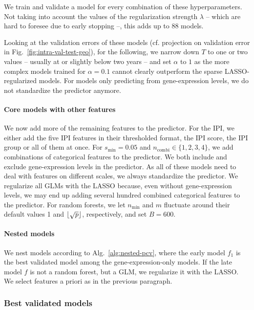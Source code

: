 We train and validate a model for every combination of these hyperparameters.
Not taking into account the values of the regularization strength $\lambda$ -- which are hard to 
foresee due to early stopping --, this adds up to \num{88} models.

Looking at the validation errors of these models (cf. projection on validation error in Fig.\ 
\ref{fig:intra-val-test-geo}), for the following, we narrow down $T$ to one or 
two values -- usually at or slightly below two years -- and set $\alpha$ to $1$ as the more complex 
models trained for $\alpha = \num{0.1}$ cannot clearly outperform the sparse LASSO-regularized 
models. For models only predicting from gene-expression levels, we do not standardize the predictor 
anymore.

\paragraph{Core models with other features}
We now add more of the remaining features to the predictor. For the 
IPI, we either add the five IPI features in their thresholded format, the IPI score, the IPI group
or all of them at once. For $s_\text{min} = \num{0.05}$ 
and $n_\text{combi} \in \{1, 2, 3, 4 \}$, we add combinations of categorical features to the 
predictor. 
We both include and exclude gene-expression levels in the predictor.
As all of these models need to deal with features on different scales, we always 
standardize the predictor. We regularize all GLMs with the LASSO because, even without 
gene-expression levels, we may end up adding 
several hundred combined categorical features to the predictor. For random forests, we let 
$n_\text{min}$ and $m$ fluctuate around their default values \num{1} and $\lfloor\sqrt{p}\rfloor$, 
respectively, and set $B = \num{600}$.

\paragraph{Nested models}
We nest models according to Alg.\ \ref{alg:nested-pcv}, where the early model $f_1$ is the best 
validated model among the gene-expression-only models. If the late model $f$ is not a random 
forest, but a GLM, we regularize it with the LASSO. We select features a priori as in the previous 
paragraph.

\subsubsection{Best validated models}

